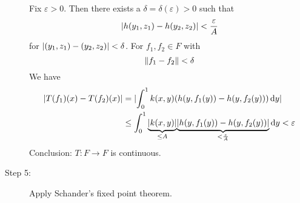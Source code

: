 \begin{beispiel}
\begin{description}
	Fix $\varepsilon >0$. Then there exists a $\delta = \delta (\varepsilon) >0$ such that
	\[
		\lvert h(y_1,z_1)-h(y_2,z_2)\rvert < \frac{\varepsilon}{A}
	\] 
	for $\lvert(y_1,z_1)-(y_2,z_2)\rvert < \delta $. For $f_1,f_2 \in F$ with
	\[
		\norm{f_1-f_2} < \delta 
	\]
	We have 
	\begin{align*}
		\lvert T(f_1)(x)-T(f_2)(x)\rvert &= \lvert\int_{0}^{1}k(x,y)(h(y,f_1(y))-h(y,f_2(y))) \,\mathrm{d}y\rvert \\
		&\leq  \int_{0}^{1}\underset{\leq A}{\underbrace{\lvert k(x,y)\rvert}}\underset{< \frac{\varepsilon}{A}}{\underbrace{\lvert h(y,f_1(y))-h(y,f_2(y))\rvert}} \,\mathrm{d}y < \varepsilon 
	\end{align*}
	Conclusion: $T: F \to F$ is continuous. 
	\item[Step 5:] Apply Schander's fixed point theorem.
	\end{description}
\end{beispiel}
